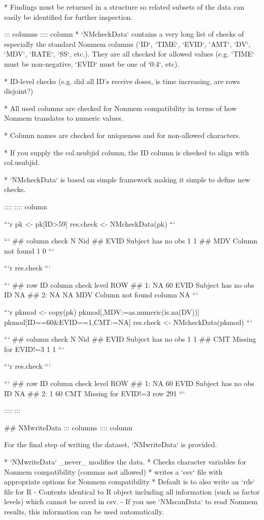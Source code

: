 * Findings must be returned in a structure so related subsets of the
  data can easily be identified for further inspection. 

::: columns
:::: column
* `NMcheckData` contains a very long list of checks of especially the standard Nonmem columns (`ID`, `TIME`, `EVID`, `AMT`, `DV`, `MDV`, `RATE`, `SS`, etc.). They are all checked for allowed values (e.g. `TIME` must be non-negative, `EVID` must be one of `0:4`, etc).

* ID-level checks (e.g. did all ID's receive doses, is time increasing, are rows disjoint?)

* All used columns are checked for Nonmem compatibility in terms of how Nonmem translates to numeric values.

* Column names are checked for uniqueness and for non-allowed characters.

* If you supply the col.usubjid column, the ID column is checked to align with col.usubjid.

* `NMcheckData` is based on simple framework making it simple to define new checks.


::::
:::: column
\scriptsize

```r
pk <- pk[ID>59]
res.check <- NMcheckData(pk)
```

```
##  column              check N Nid
##    EVID Subject has no obs 1   1
##     MDV   Column not found 1   0
```

```r
res.check
```

```
##    row ID column              check  level ROW
## 1:  NA 60   EVID Subject has no obs     ID  NA
## 2:  NA NA    MDV   Column not found column  NA
```

```r
pkmod <- copy(pk)
pkmod[,MDV:=as.numeric(is.na(DV))]
pkmod[ID==60&EVID==1,CMT:=NA]
res.check <- NMcheckData(pkmod)
```

```
##  column               check N Nid
##    EVID  Subject has no obs 1   1
##     CMT Missing for EVID!=3 1   1
```

```r
res.check
```

```
##    row ID column               check level ROW
## 1:  NA 60   EVID  Subject has no obs    ID  NA
## 2:   1 60    CMT Missing for EVID!=3   row 291
```

:::: 
:::


## NMwriteData
::: columns
:::: column

For the final step of writing the dataset, `NMwriteData` is
provided. 

* `NMwriteData` _never_ modifies the data.
* Checks character variables for Nonmem compatibility (commas not allowed)
* writes a `csv` file with appropriate options for Nonmem compatibility
* Default is to also write an `rds` file for R 
- Contents identical to R object including all information (such as factor levels) which cannot be saved in csv. 
- If you use `NMscanData` to read Nonmem results,  this information can be used automatically. 

